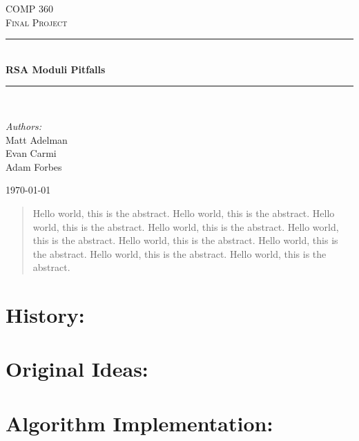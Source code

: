 \documentclass[12pt]{article}
\newcommand{\HRule}{\rule{\linewidth}{0.5mm}}
\begin{document}
\begin{titlepage}

\begin{center}
\textsc{\LARGE COMP 360}\\[1.5cm]
\textsc{\Large Final Project}\\[0.5cm]
\HRule \\[0.4cm]
{ \huge \bfseries RSA Moduli Pitfalls}\\[0.4cm]
\HRule \\[1.5cm]
\begin{minipage}{0.4\textwidth}
\begin{center} \large
\emph{Authors:}\\
Matt Adelman\\Evan Carmi\\Adam Forbes
\end{center}
\end{minipage}
\vfill
{\large \today}
\end{center}
\end{titlepage}

\tableofcontents

\newpage

\begin{@twocolumnfalse}

\begin{abstract}
  Hello world, this is the abstract.  Hello world, this is the abstract.
  Hello world, this is the abstract.  Hello world, this is the abstract.  Hello world, this is the abstract.  Hello world, this is the abstract.  Hello world, this is the abstract.  Hello world, this is the abstract.  Hello world, this is the abstract.
\end{abstract}
\end{@twocolumnfalse}


\section{History:}

\section{Original Ideas:}

\section{Algorithm Implementation:}
\end{document}
